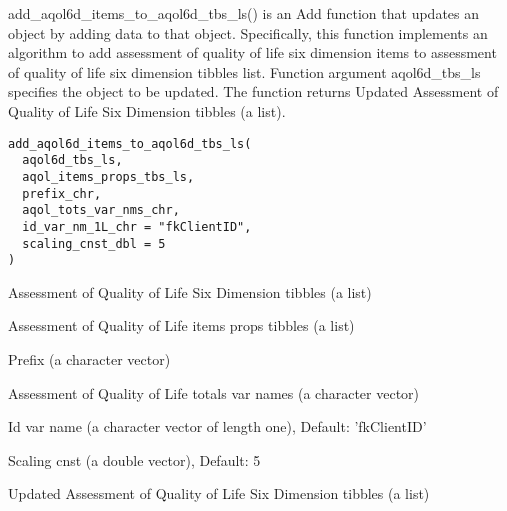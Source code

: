 \documentclass[a4paper]{book}
\begin{document}
%
\begin{Description}\relax
add\_aqol6d\_items\_to\_aqol6d\_tbs\_ls() is an Add function that updates an object by adding data to that object. Specifically, this function implements an algorithm to add assessment of quality of life six dimension items to assessment of quality of life six dimension tibbles list. Function argument aqol6d\_tbs\_ls specifies the object to be updated. The function returns Updated Assessment of Quality of Life Six Dimension tibbles (a list).
\end{Description}
%
\begin{Usage}
\begin{verbatim}
add_aqol6d_items_to_aqol6d_tbs_ls(
  aqol6d_tbs_ls,
  aqol_items_props_tbs_ls,
  prefix_chr,
  aqol_tots_var_nms_chr,
  id_var_nm_1L_chr = "fkClientID",
  scaling_cnst_dbl = 5
)
\end{verbatim}
\end{Usage}
%
\begin{Arguments}
\begin{ldescription}
\item[\code{aqol6d\_tbs\_ls}] Assessment of Quality of Life Six Dimension tibbles (a list)

\item[\code{aqol\_items\_props\_tbs\_ls}] Assessment of Quality of Life items props tibbles (a list)

\item[\code{prefix\_chr}] Prefix (a character vector)

\item[\code{aqol\_tots\_var\_nms\_chr}] Assessment of Quality of Life totals var names (a character vector)

\item[\code{id\_var\_nm\_1L\_chr}] Id var name (a character vector of length one), Default: 'fkClientID'

\item[\code{scaling\_cnst\_dbl}] Scaling cnst (a double vector), Default: 5
\end{ldescription}
\end{Arguments}
%
\begin{Value}
Updated Assessment of Quality of Life Six Dimension tibbles (a list)
\end{Value}
\end{document}
